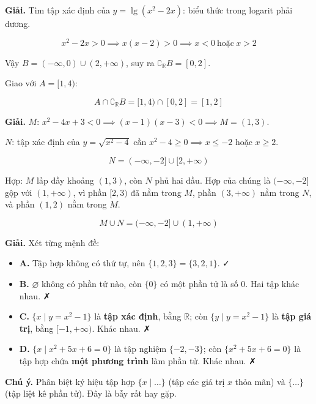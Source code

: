 \documentclass[11pt, a4paper]{article}
\begin{document}
\begin{dapan}[4 — Đáp án A]
\textbf{Giải.} Tìm tập xác định của $y = \lg(x^2 - 2x)$: biểu thức trong logarit phải dương.

$$x^2 - 2x > 0 \implies x(x-2) > 0 \implies x < 0 \ \text{hoặc} \ x > 2$$

Vậy $B = (-\infty, 0) \cup (2, +\infty)$, suy ra $\complement_{\mathbb{R}} B = [0, 2]$.

Giao với $A = [1, 4)$:

$$A \cap \complement_{\mathbb{R}} B = [1, 4) \cap [0, 2] = [1, 2]$$
\end{dapan}

\begin{dapan}[5 — Đáp án D]
\textbf{Giải.} $M$: $x^2 - 4x + 3 < 0 \implies (x-1)(x-3) < 0 \implies M = (1, 3)$.

$N$: tập xác định của $y = \sqrt{x^2-4}$ cần $x^2 - 4 \ge 0 \implies x \le -2$ hoặc $x \ge 2$.

$$N = (-\infty, -2] \cup [2, +\infty)$$

Hợp: $M$ lấp đầy khoảng $(1,3)$, còn $N$ phủ hai đầu. Hợp của chúng là $(-\infty, -2]$ gộp với $(1, +\infty)$, vì phần $[2, 3)$ đã nằm trong $M$, phần $(3, +\infty)$ nằm trong $N$, và phần $(1,2)$ nằm trong $M$.

$$M \cup N = (-\infty, -2] \cup (1, +\infty)$$
\end{dapan}

\begin{dapan}[6 — Đáp án A]
\textbf{Giải.} Xét từng mệnh đề:

\begin{itemize}[leftmargin=1.4em, itemsep=2pt]
\item \textbf{A.} Tập hợp không có thứ tự, nên $\{1,2,3\} = \{3,2,1\}$. ✓
\item \textbf{B.} $\varnothing$ không có phần tử nào, còn $\{0\}$ có một phần tử là số $0$. Hai tập khác nhau. ✗
\item \textbf{C.} $\{x \mid y = x^2-1\}$ là \textbf{tập xác định}, bằng $\mathbb{R}$; còn $\{y \mid y = x^2-1\}$ là \textbf{tập giá trị}, bằng $[-1, +\infty)$. Khác nhau. ✗
\item \textbf{D.} $\{x \mid x^2+5x+6=0\}$ là tập nghiệm $\{-2,-3\}$; còn $\{x^2+5x+6=0\}$ là tập hợp chứa \textbf{một phương trình} làm phần tử. Khác nhau. ✗
\end{itemize}


\textbf{Chú ý.} Phân biệt ký hiệu tập hợp $\{x \mid \dots\}$ (tập các giá trị $x$ thỏa mãn) và $\{\dots\}$ (tập liệt kê phần tử). Đây là bẫy rất hay gặp.
\end{dapan}
\end{document}
